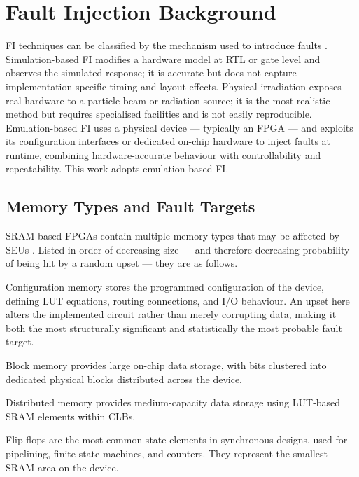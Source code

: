 \section{Fault Injection Background}
\label{chap8:fi_background}

\ac{FI} techniques can be classified by the mechanism used to introduce faults \cite{Hsueh1997}. Simulation-based \ac{FI} modifies a hardware model at \ac{RTL} or gate level and observes the simulated response; it is accurate but does not capture implementation-specific timing and layout effects. Physical irradiation exposes real hardware to a particle beam or radiation source; it is the most realistic method but requires specialised facilities and is not easily reproducible. Emulation-based \ac{FI} uses a physical device — typically an \ac{FPGA} — and exploits its configuration interfaces or dedicated on-chip hardware to inject faults at runtime, combining hardware-accurate behaviour with controllability and repeatability. This work adopts emulation-based \ac{FI}.

\subsection{Memory Types and Fault Targets}
\label{chap8:fi_targets}

\ac{SRAM}-based \acp{FPGA} contain multiple memory types that may be affected by \acp{SEU} \cite{SEM,Kastensmidt2006}. Listed in order of decreasing size — and therefore decreasing probability of being hit by a random upset — they are as follows.

Configuration memory stores the programmed configuration of the device, defining \ac{LUT} equations, routing connections, and \ac{I/O} behaviour. An upset here alters the implemented circuit rather than merely corrupting data, making it both the most structurally significant and statistically the most probable fault target.

Block memory provides large on-chip data storage, with bits clustered into dedicated physical blocks distributed across the device.

Distributed memory provides medium-capacity data storage using \ac{LUT}-based \ac{SRAM} elements within \acp{CLB}.

Flip-flops are the most common state elements in synchronous designs, used for pipelining, finite-state machines, and counters. They represent the smallest \ac{SRAM} area on the device.

